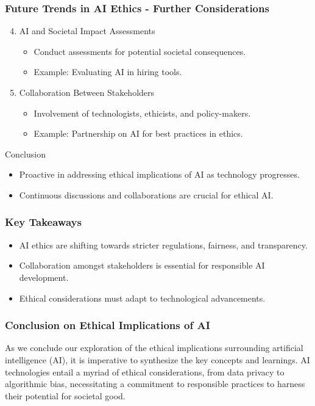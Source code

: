 \documentclass[aspectratio=169]{beamer}
\begin{document}
\begin{frame}[fragile]
    \frametitle{Future Trends in AI Ethics - Further Considerations}
    \begin{enumerate}
        \setcounter{enumi}{3}
        \item AI and Societal Impact Assessments
            \begin{itemize}
                \item Conduct assessments for potential societal consequences.
                \item Example: Evaluating AI in hiring tools.
            \end{itemize}
        \item Collaboration Between Stakeholders
            \begin{itemize}
                \item Involvement of technologists, ethicists, and policy-makers.
                \item Example: Partnership on AI for best practices in ethics.
            \end{itemize}
    \end{enumerate}

    \begin{block}{Conclusion}
        \begin{itemize}
            \item Proactive in addressing ethical implications of AI as technology progresses.
            \item Continuous discussions and collaborations are crucial for ethical AI.
        \end{itemize}
    \end{block}
\end{frame}

\begin{frame}[fragile]
    \frametitle{Key Takeaways}
    \begin{itemize}
        \item AI ethics are shifting towards stricter regulations, fairness, and transparency.
        \item Collaboration amongst stakeholders is essential for responsible AI development.
        \item Ethical considerations must adapt to technological advancements.
    \end{itemize}
\end{frame}

\begin{frame}[fragile]
    \frametitle{Conclusion on Ethical Implications of AI}
    As we conclude our exploration of the ethical implications surrounding artificial intelligence (AI), 
    it is imperative to synthesize the key concepts and learnings. 
    AI technologies entail a myriad of ethical considerations, from data privacy to algorithmic bias, 
    necessitating a commitment to responsible practices to harness their potential for societal good.
\end{frame}
\end{document}

